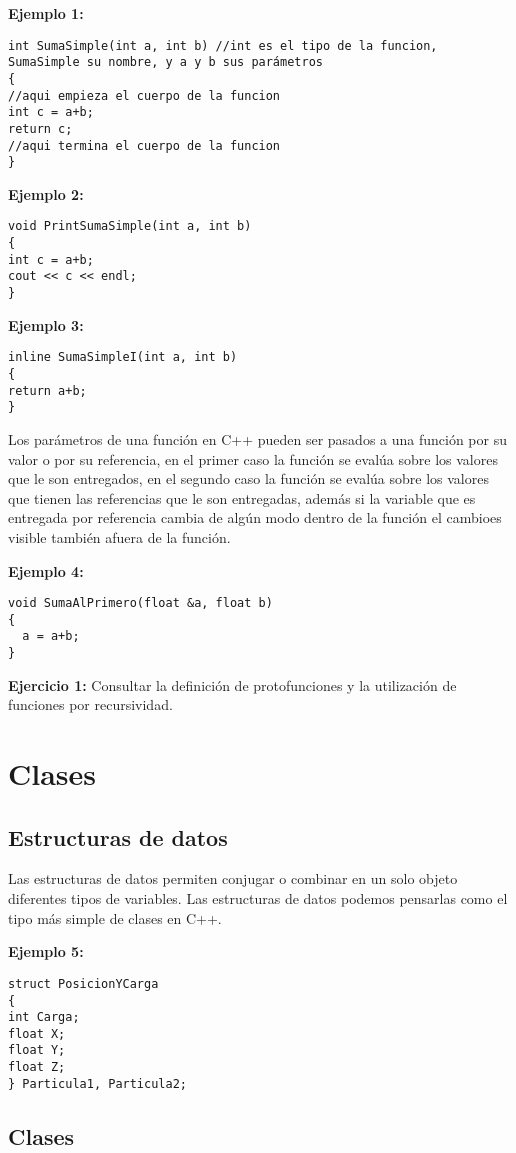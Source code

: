 \documentclass[10.5pt]{article}
\begin{document}
{\bf Ejemplo 1:}
\begin{verbatim}
int SumaSimple(int a, int b) //int es el tipo de la funcion, SumaSimple su nombre, y a y b sus parámetros
{
//aqui empieza el cuerpo de la funcion
int c = a+b;
return c;
//aqui termina el cuerpo de la funcion
}
\end{verbatim}

{\bf Ejemplo 2:}
\begin{verbatim}
void PrintSumaSimple(int a, int b) 
{
int c = a+b;
cout << c << endl;
}
\end{verbatim}

{\bf Ejemplo 3:}
\begin{verbatim}
inline SumaSimpleI(int a, int b) 
{
return a+b;
}
\end{verbatim}

Los parámetros de una función en C++ pueden ser pasados a una función por su valor o por su referencia, en el primer caso la función se evalúa sobre los valores que le son entregados, en el segundo caso la función se evalúa sobre los valores que tienen las referencias que le son entregadas, además si la variable que es entregada por referencia cambia de algún modo dentro de la función el cambioes visible también afuera de la función.

{\bf Ejemplo 4:}
\begin{verbatim}
void SumaAlPrimero(float &a, float b) 
{
  a = a+b;
}
\end{verbatim}

{\bf Ejercicio 1:} Consultar la definición de protofunciones y la utilización de funciones por recursividad.

\section{Clases}
\subsection{Estructuras de datos}

Las estructuras de datos permiten conjugar o combinar en un solo objeto diferentes tipos de variables. Las estructuras de datos podemos pensarlas como el tipo más simple de clases en C++.

{\bf Ejemplo 5:}
\begin{verbatim}
struct PosicionYCarga
{
int Carga;
float X;
float Y;
float Z;
} Particula1, Particula2;
\end{verbatim}

\subsection{Clases}
\end{document}
